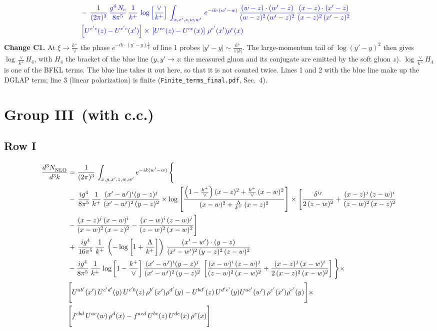 \documentclass[9pt]{article}
\newcommand{\new}[1]{{\color{blue}#1}}
\newcommand{\nc}{\color{blue}}
\numberwithin{equation}{section}
\begin{document}
\begin{align}
\notag \\ & \nc -\,\frac{1}{(2\pi)^{3}}\,\frac{g^{4}\,N_{c}}{8\pi^{5}}\,\frac{1}{k^{+}}\,\log{\left[\frac{\vee}{k^{+}}\right]}\,\int_{x,x',z,w,w'}\,e^{-ik\cdot (w'-w)}\,\frac{(w-z)\cdot(w'-z)}{(w-z)^{2}\,(w'-z)^{2}}\,\frac{(x-z)\cdot(x'-z)}{(x-z)^{2}\,(x'-z)^{2}}\notag \\ & \nc \left[U^{e'c}(z) - U^{e'c}(x')\right] \times\, \left[U^{ec}(z) - U^{ce}(x)\right]\, \rho^{e'}(x') \rho^{e}(x)
\end{align}
\new{\textbf{Change C1.} At $\xi\to\frac{k^+}{\vee}$ the phase $e^{-ik\cdot(y'-y)\frac1\xi}$ of line 1 probes $|y'-y|\sim\frac{k^+}{\vee|k|}$. The large-momentum tail of $\log(y'-y)^2$ then gives $\log\frac{\vee}{k^+}H_4$, with $H_4$ the bracket of the blue line ($y,y'\to z$: the measured gluon and its conjugate are emitted by the soft gluon $z$). $\log\frac{\vee}{k^+}H_4$ is one of the BFKL terms. The blue line takes it out here, so that it is not counted twice.
Lines 1 and 2 with the blue line make up the DGLAP term; line 3 (linear polarization) is finite (\texttt{Finite\_terms\_final.pdf}, Sec.~4).}
\section{Group III\, (with c.c.)}
\subsection{Row I}
\begin{align}
     \frac{d^{3}N_{\rm NLO}^{\rm}}{d^{3}k}  & =  \frac{1}{(2\pi)^{3}}\, \int_{x,y,x',z,w,w^{\prime}} e^{-ik(w^{\prime}-w)}\, \Bigg\{\notag \\ & -\,\frac{ig^{4}}{8\pi^{5}}\,\frac{1}{k^{+}}\,\frac{(x'-w')^{i}(y-z)^{j}}{(x'-w')^{2}\,(y-z)^{2}}\times \log{\left[\frac{\left(1-\frac{k^{+}}{\vee}\right)(x-z)^{2}+\frac{k^{+}}{\vee}\,(x-w)^{2}}{(x-w)^{2}+\frac{\Lambda}{k^{+}}\,(x-z)^{2}}\right]}\times \Bigg[\frac{\delta^{ij}}{2\,(z-w)^{2}}+\frac{(x-z)^{j}\,(z-w)^{i}}{(z-w)^{2}\,(x-z)^{2}}\notag \\ & -\frac{(x-z)^{j}\,(x-w)^{i}}{(x-w)^{2}\,(x-z)^{2}}-\frac{(x-w)^{i}\,(z-w)^{j}}{(z-w)^{2}\,(x-w)^{2}}\Bigg]\notag \\ & +\,\frac{ig^{4}}{16\pi^{5}}\,\frac{1}{k^{+}}\,\left(-\log{\left[1+\frac{\Lambda}{k^{+}}\right]}\right)\, \frac{(x'-w')\cdot (y-z)}{(x'-w')^{2}\,(y-z)^{2}\,(z-w)^{2}}\notag \\ & -\frac{ig^{4}}{8\pi^{5}}\,\frac{1}{k^{+}}\, \log{\left[1-\frac{k^{+}}{\vee}\right]}\,\frac{(x'-w')^{i}(y-z)^{j}}{(x'-w')^{2}\,(y-z)^{2}}\,\left[\frac{(x-w)^{i}\,(z-w)^{j}}{(z-w)^{2}\,(x-w)^{2}}+\frac{(x-z)^{j}\,(x-w)^{i}}{2\,(x-z)^{2}\, (x-w)^{2}}\right]\Bigg\}\times \notag \\ &  \Bigg[U^{ab'}(x')\,U^{c'd'}(y)\,U^{c'b}(z)\,\rho^{b'}(x')\rho^{d'}(y)-U^{bd'}(z)\,U^{d'e'}(y)U^{ac'}(w')\,\rho^{c'}(x')\rho^{e'}(y)\Bigg]\times\notag \\ & \Bigg[f^{cbd}\,U^{ac}(w)\,\rho^{d}(x)-f^{acd}\, U^{bc}(z)\,U^{de}(x)\,\rho^{e}(x)\Bigg] 
\end{align}
\end{document}
